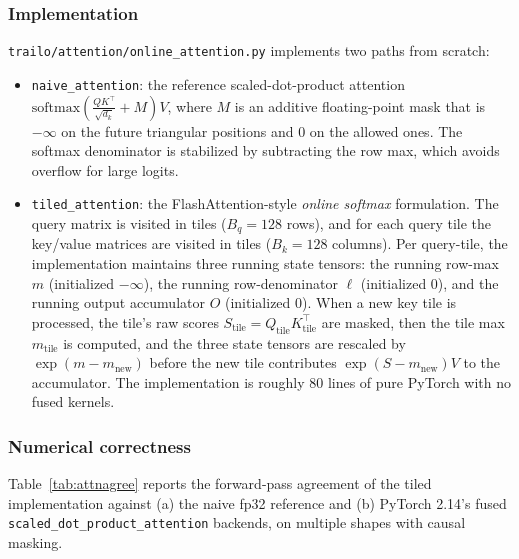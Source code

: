 \documentclass[conference]{IEEEtran}
\newcommand{\code}[1]{\texttt{\small #1}}
\begin{document}
\subsubsection{Implementation}
\code{trailo/attention/online\_attention.py} implements two
paths from scratch:
\begin{itemize}[leftmargin=*, itemsep=1pt, topsep=2pt]
\item \code{naive\_attention}: the reference
scaled-dot-product attention
$\text{softmax}(\frac{QK^\top}{\sqrt{d_k}} + M)V$, where $M$ is
an additive floating-point mask that is $-\infty$ on the future
triangular positions and 0 on the allowed ones. The softmax
denominator is stabilized by subtracting the row max, which
avoids overflow for large logits.
\item \code{tiled\_attention}: the FlashAttention-style
\emph{online softmax} formulation. The query matrix is visited
in tiles ($B_q = 128$ rows), and for each query tile the key/value
matrices are visited in tiles ($B_k = 128$ columns). Per
query-tile, the implementation maintains three running state
tensors: the running row-max $m$ (initialized $-\infty$),
the running row-denominator $\ell$ (initialized 0), and the
running output accumulator $O$ (initialized 0). When a new
key tile is processed, the tile's raw scores
$S_\text{tile} = Q_\text{tile} K_\text{tile}^\top$ are masked,
then the tile max $m_\text{tile}$ is computed, and the three
state tensors are rescaled by
$\exp(m - m_\text{new})$ before the new tile contributes
$\exp(S - m_\text{new})V$ to the accumulator. The implementation
is roughly 80 lines of pure PyTorch with no fused kernels.
\end{itemize}

\subsubsection{Numerical correctness}
Table~\ref{tab:attnagree} reports the forward-pass agreement of
the tiled implementation against (a) the naive fp32 reference
and (b) PyTorch 2.14's fused \code{scaled\_dot\_product\_attention}
backends, on multiple shapes with causal masking.
\end{document}
